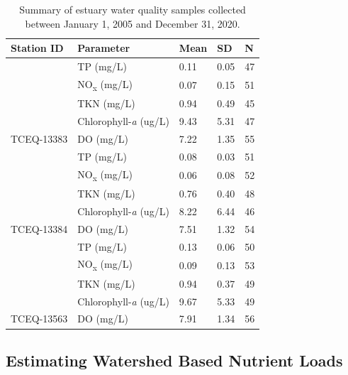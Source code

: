 \documentclass[sn-basic,referee,lineno,pdflatex]{sn-jnl}
\begin{document}
\begin{table}

\caption{\label{tab:table2}Summary of estuary water quality samples collected between January 1, 2005 and December 31, 2020.}
\centering
\begin{tabular}[t]{lllll}
\toprule
Station ID & Parameter & Mean & SD & N\\
\midrule
 & TP (mg/L) & 0.11 & 0.05 & 47\\

 & NO\textsubscript{x} (mg/L) & 0.07 & 0.15 & 51\\

 & TKN (mg/L) & 0.94 & 0.49 & 45\\

 & Chlorophyll-\textit{a} (ug/L) & 9.43 & 5.31 & 47\\

\multirow{-5}{*}{\raggedright\arraybackslash TCEQ-13383} & DO (mg/L) & 7.22 & 1.35 & 55\\
\cmidrule{1-5}
 & TP (mg/L) & 0.08 & 0.03 & 51\\

 & NO\textsubscript{x} (mg/L) & 0.06 & 0.08 & 52\\

 & TKN (mg/L) & 0.76 & 0.40 & 48\\

 & Chlorophyll-\textit{a} (ug/L) & 8.22 & 6.44 & 46\\

\multirow{-5}{*}{\raggedright\arraybackslash TCEQ-13384} & DO (mg/L) & 7.51 & 1.32 & 54\\
\cmidrule{1-5}
 & TP (mg/L) & 0.13 & 0.06 & 50\\

 & NO\textsubscript{x} (mg/L) & 0.09 & 0.13 & 53\\

 & TKN (mg/L) & 0.94 & 0.37 & 49\\

 & Chlorophyll-\textit{a} (ug/L) & 9.67 & 5.33 & 49\\

\multirow{-5}{*}{\raggedright\arraybackslash TCEQ-13563} & DO (mg/L) & 7.91 & 1.34 & 56\\
\bottomrule
\end{tabular}
\end{table}

\hypertarget{estimating-watershed-based-nutrient-loads}{%
\subsection{Estimating Watershed Based Nutrient
Loads}\label{estimating-watershed-based-nutrient-loads}}
\end{document}
